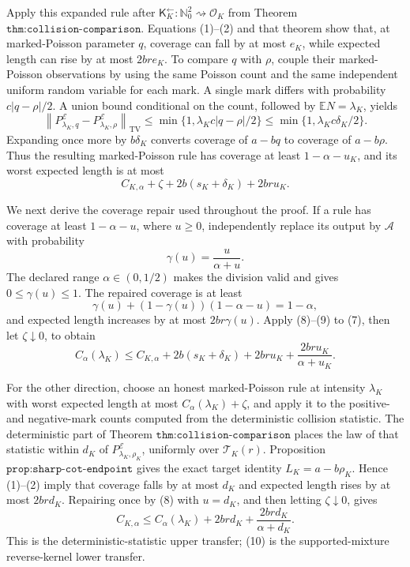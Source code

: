 Apply this expanded rule after
\(\mathsf K_K^{\leftarrow}:\mathbb N_0^2\rightsquigarrow\mathcal O_K\)
from Theorem \(\texttt{thm:collision-comparison}\).  Equations (1)--(2)
and that theorem show that, at marked-Poisson parameter \(q\), coverage
can fall by at most \(e_K\), while expected length can rise by at most
\(2br e_K\).  To compare \(q\) with \(\rho\), couple their
marked-Poisson observations by using the same Poisson count and the same
independent uniform random variable for each mark.  A single mark differs
with probability \(c|q-\rho|/2\).  A union bound conditional on the count,
followed by \(\mathbb EN=\lambda_K\), yields
\[
 \left\lVert P^{\mathcal E}_{\lambda_K,q}
 -P^{\mathcal E}_{\lambda_K,\rho}\right\rVert_{\mathrm{TV}}
 \leq\min\{1,\lambda_Kc|q-\rho|/2\}
 \leq\min\{1,\lambda_Kc\delta_K/2\}.
 \tag{6}
\]
Expanding once more by \(b\delta_K\) converts coverage of \(a-bq\)
to coverage of \(a-b\rho\).  Thus the resulting marked-Poisson rule has
coverage at least \(1-\alpha-u_K\), and its worst expected length is at
most
\[
 C_{K,\alpha}+\zeta+2b(s_K+\delta_K)+2br u_K.
 \tag{7}
\]

We next derive the coverage repair used throughout the proof.  If a rule
has coverage at least \(1-\alpha-u\), where \(u\geq0\), independently
replace its output by \(\mathcal A\) with probability
\[
 \gamma(u)=\frac{u}{\alpha+u}.
 \tag{8}
\]
The declared range \(\alpha\in(0,1/2)\) makes the division valid and gives
\(0\leq\gamma(u)\leq1\).  The repaired coverage is at least
\[
 \gamma(u)+(1-\gamma(u))(1-\alpha-u)=1-\alpha,
 \tag{9}
\]
and expected length increases by at most \(2br\gamma(u)\).  Apply
(8)--(9) to (7), then let \(\zeta\downarrow0\), to obtain
\[
 C_\alpha(\lambda_K)
 \leq C_{K,\alpha}+2b(s_K+\delta_K)+2br u_K
 +\frac{2br u_K}{\alpha+u_K}.
 \tag{10}
\]

For the other direction, choose an honest marked-Poisson rule at intensity
\(\lambda_K\) with worst expected length at most
\(C_\alpha(\lambda_K)+\zeta\), and apply it to the positive- and
negative-mark counts computed from the deterministic collision statistic.
The deterministic part of Theorem \(\texttt{thm:collision-comparison}\)
places the law of that statistic within \(d_K\) of
\(P^{\mathcal E}_{\lambda_K,\rho_K}\), uniformly over
\(\mathcal T_K(r)\).  Proposition
\(\texttt{prop:sharp-cot-endpoint}\) gives the exact target identity
\(L_K=a-b\rho_K\).  Hence (1)--(2) imply that coverage falls by at most
\(d_K\) and expected length rises by at most \(2brd_K\).  Repairing once
by (8) with \(u=d_K\), and then letting \(\zeta\downarrow0\), gives
\[
 C_{K,\alpha}
 \leq C_\alpha(\lambda_K)+2brd_K
 +\frac{2brd_K}{\alpha+d_K}.
 \tag{11}
\]
This is the deterministic-statistic upper transfer; (10) is the
supported-mixture reverse-kernel lower transfer.


